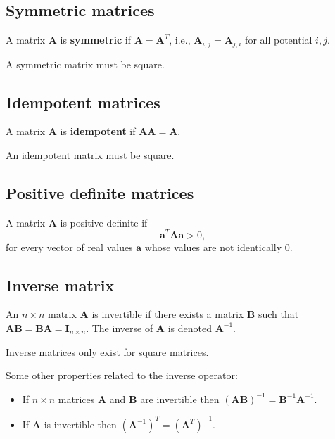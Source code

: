 \documentclass[
]{book}
\providecommand{\tightlist}{%
  \setlength{\itemsep}{0pt}\setlength{\parskip}{0pt}}
\theoremstyle{definition}
\theoremstyle{definition}
\theoremstyle{definition}
\theoremstyle{definition}
\theoremstyle{remark}
\begin{document}
\hypertarget{symmetric-matrices}{%
\subsection{Symmetric matrices}\label{symmetric-matrices}}

A matrix \(\mathbf{A}\) is \textbf{symmetric} if \(\mathbf{A} = \mathbf{A}^T\), i.e., \(\mathbf{A}_{i,j} = \mathbf{A}_{j,i}\) for all potential \(i,j\).

A symmetric matrix must be square.

\hypertarget{idempotent-matrices}{%
\subsection{Idempotent matrices}\label{idempotent-matrices}}

A matrix \(\mathbf{A}\) is \textbf{idempotent} if \(\mathbf{AA} = \mathbf{A}\).

An idempotent matrix must be square.

\hypertarget{positive-definite-matrices}{%
\subsection{Positive definite matrices}\label{positive-definite-matrices}}

A matrix \(\mathbf{A}\) is positive definite if
\[\mathbf{a}^T \mathbf{Aa} > 0,\]
for every vector of real values \(\mathbf{a}\) whose values are not identically 0.

\hypertarget{inverse-matrix}{%
\subsection{Inverse matrix}\label{inverse-matrix}}

An \(n\times n\) matrix \(\mathbf{A}\) is invertible if there exists a matrix \(\mathbf{B}\) such that \(\mathbf{AB}=\mathbf{BA}=\mathbf{I}_{n\times n}\). The inverse of \(\mathbf{A}\) is denoted \(\mathbf{A}^{-1}\).

Inverse matrices only exist for square matrices.

Some other properties related to the inverse operator:

\begin{itemize}
\tightlist
\item
  If \(n\times n\) matrices \(\mathbf{A}\) and \(\mathbf{B}\) are invertible then \((\mathbf{AB})^{-1} = \mathbf{B}^{-1} \mathbf{A} ^{-1}\).
\item
  If \(\mathbf{A}\) is invertible then \((\mathbf{A}^{-1})^T = (\mathbf{A}^T)^{-1}\).
\end{itemize}
\end{document}
